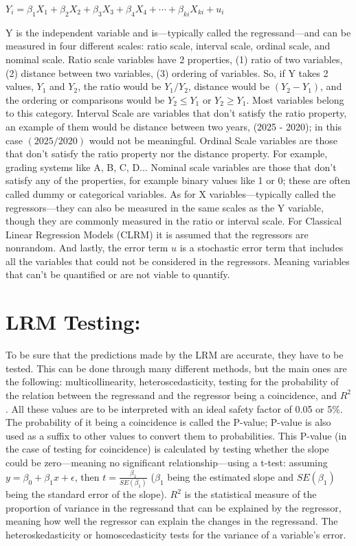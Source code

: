 \documentclass[12pt]{article}
\begin{document}
$
Y_i = \beta_1 X_1 + \beta_2 X_2 + \beta_3 X_3 + \beta_4 X_4 + \cdots + \beta_{ki} X_{ki} + u_i
$

Y is the independent variable and is—typically called the regressand—and can be measured in four different scales: ratio scale, interval scale, ordinal scale, and nominal scale. Ratio scale variables have 2 properties, (1) ratio of two variables, (2) distance between two variables, (3) ordering of variables. So, if Y takes 2 values, $Y_1$ and $Y_2$, the ratio would be $Y_1/Y_2$, distance would be $(Y_2 - Y_1)$, and the ordering or comparisons would be $Y_2 \le Y_1$ or $Y_2 \ge Y_1$. Most variables belong to this category. Interval Scale are variables that don’t satisfy the ratio property, an example of them would be distance between two years, (2025 - 2020); in this case $(2025/2020)$ would not be meaningful. Ordinal Scale variables are those that don’t satisfy the ratio property nor the distance property. For example, grading systems like A, B, C, D... Nominal scale variables are those that don’t satisfy any of the properties, for example binary values like 1 or 0; these are often called dummy or categorical variables. As for X variables—typically called the regressors—they can also be measured in the same scales as the Y variable, though they are commonly measured in the ratio or interval scale. For Classical Linear Regression Models (CLRM) it is assumed that the regressors are nonrandom. And lastly, the error term $u$ is a stochastic error term that includes all the variables that could not be considered in the regressors. Meaning variables that can’t be quantified or are not viable to quantify.

\section{LRM Testing:}

To be sure that the predictions made by the LRM are accurate, they have to be tested. This can be done through many different methods, but the main ones are the following: multicollinearity, heteroscedasticity, testing for the probability of the relation between the regressand and the regressor being a coincidence, and $R^2$. All these values are to be interpreted with an ideal safety factor of 0.05 or 5\%. The probability of it being a coincidence is called the P-value; P-value is also used as a suffix to other values to convert them to probabilities. This P-value (in the case of testing for coincidence) is calculated by testing whether the slope could be zero—meaning no significant relationship—using a t-test: assuming $y = \beta_0 + \beta_1 x + \epsilon$, then
$
t = \frac{\beta_1}{SE(\beta_1)}
$
($\beta_1$ being the estimated slope and $SE(\beta_1)$ being the standard error of the slope). $R^2$ is the statistical measure of the proportion of variance in the regressand that can be explained by the regressor, meaning how well the regressor can explain the changes in the regressand. The heteroskedasticity or homoscedasticity tests for the variance of a variable’s error.
\end{document}
